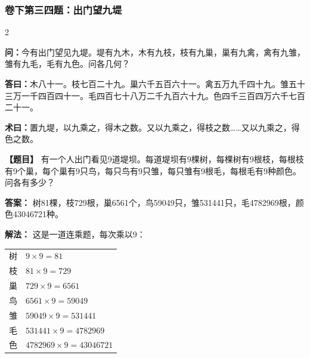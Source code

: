 \documentclass[11pt,a4paper]{article}
\begin{document}
\vspace{0.3cm}

\subsubsection*{卷下第三四题：出门望九堤}
\begin{paracol}{2}
\begin{problemclassical}
\textbf{问：}今有出门望见九堤。堤有九木，木有九枝，枝有九巢，巢有九禽，禽有九雏，雏有九毛，毛有九色。问各几何？

\textbf{答曰：}木八十一。枝七百二十九。巢六千五百六十一。禽五万九千四十九。雏五十三万一千四百四十一。毛四百七十八万二千九百六十九。色四千三百四万六千七百二十一。

\textbf{术曰：}置九堤，以九乘之，得木之数。又以九乘之，得枝之数……又以九乘之，得色之数。
\end{problemclassical}
\switchcolumn
\begin{problemmodern}
\textbf{【题目】} 有一个人出门看见9道堤坝。每道堤坝有9棵树，每棵树有9根枝，每根枝有9个巢，每个巢有9只鸟，每只鸟有9只雏，每只雏有9根毛，每根毛有9种颜色。问各有多少？

\textbf{答案：} 树81棵，枝729根，巢6561个，鸟59049只，雏531441只，毛4782969根，颜色43046721种。

\textbf{解法：} 这是一道连乘题，每次乘以9：

\begin{tabular}{@{}ll@{}}
树 & $9 \times 9 = 81$ \\
枝 & $81 \times 9 = 729$ \\
巢 & $729 \times 9 = 6561$ \\
鸟 & $6561 \times 9 = 59049$ \\
雏 & $59049 \times 9 = 531441$ \\
毛 & $531441 \times 9 = 4782969$ \\
色 & $4782969 \times 9 = 43046721$ \\
\end{tabular}
\end{problemmodern}
\end{paracol}

\newpage
\end{document}
